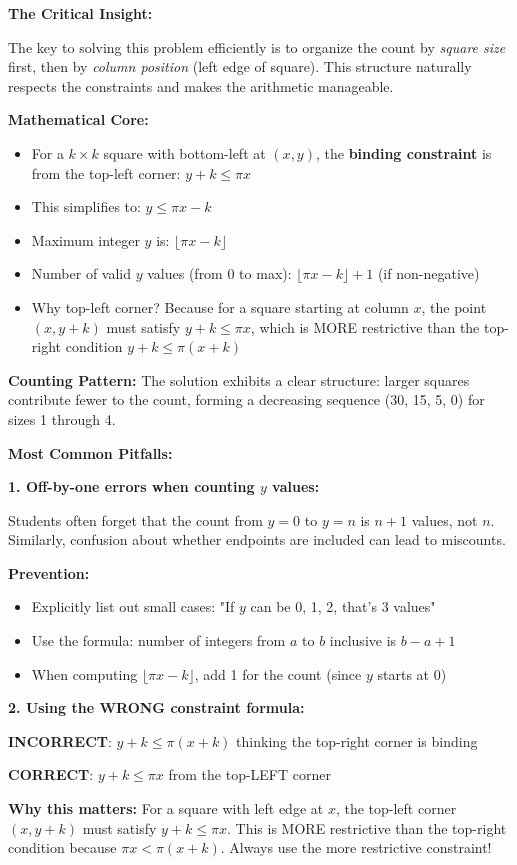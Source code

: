 \documentclass[12pt]{article}
\begin{document}
\begin{keyinsightbox}
\textbf{The Critical Insight:}

The key to solving this problem efficiently is to organize the count by \textit{square size} first, then by \textit{column position} (left edge of square). This structure naturally respects the constraints and makes the arithmetic manageable.

\textbf{Mathematical Core:}
\begin{itemize}
    \item For a $k \times k$ square with bottom-left at $(x, y)$, the \textbf{binding constraint} is from the top-left corner: $y + k \leq \pi x$
    \item This simplifies to: $y \leq \pi x - k$
    \item Maximum integer $y$ is: $\lfloor \pi x - k \rfloor$
    \item Number of valid $y$ values (from 0 to max): $\lfloor \pi x - k \rfloor + 1$ (if non-negative)
    \item Why top-left corner? Because for a square starting at column $x$, the point $(x, y+k)$ must satisfy $y+k \leq \pi x$, which is MORE restrictive than the top-right condition $y+k \leq \pi(x+k)$
\end{itemize}

\textbf{Counting Pattern:}
The solution exhibits a clear structure: larger squares contribute fewer to the count, forming a decreasing sequence (30, 15, 5, 0) for sizes 1 through 4.
\end{keyinsightbox}

\begin{warningbox}
\textbf{Most Common Pitfalls:}

\textbf{1. Off-by-one errors when counting $y$ values:}

Students often forget that the count from $y=0$ to $y=n$ is $n+1$ values, not $n$. Similarly, confusion about whether endpoints are included can lead to miscounts.

\textbf{Prevention:}
\begin{itemize}
    \item Explicitly list out small cases: "If $y$ can be 0, 1, 2, that's 3 values"
    \item Use the formula: number of integers from $a$ to $b$ inclusive is $b - a + 1$
    \item When computing $\lfloor \pi x - k \rfloor$, add 1 for the count (since $y$ starts at 0)
\end{itemize}

\textbf{2. Using the WRONG constraint formula:}

\textbf{INCORRECT}: $y + k \leq \pi(x+k)$ thinking the top-right corner is binding

\textbf{CORRECT}: $y + k \leq \pi x$ from the top-LEFT corner

\textbf{Why this matters:} For a square with left edge at $x$, the top-left corner $(x, y+k)$ must satisfy $y+k \leq \pi x$. This is MORE restrictive than the top-right condition because $\pi x < \pi(x+k)$. Always use the more restrictive constraint!
\end{warningbox}
\end{document}
